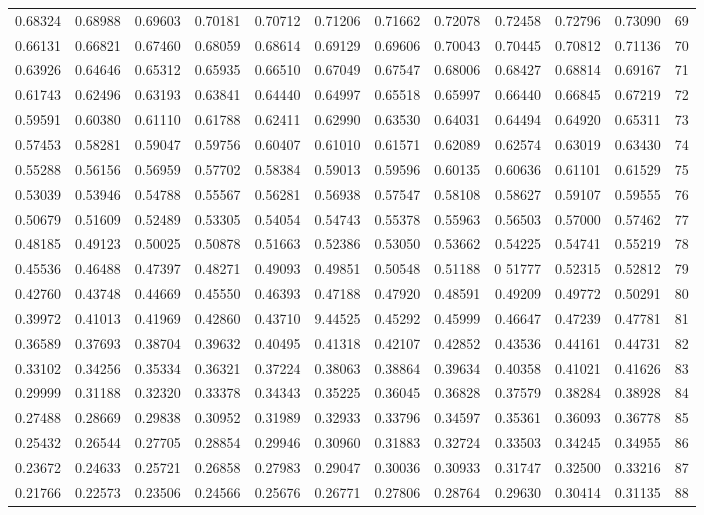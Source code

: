 \begin{center}
\begin{tabular}{|rrrrrrrrrrr|r|}
0.68324&0.68988&0.69603&0.70181&0.70712&0.71206&0.71662&0.72078&0.72458&0.72796&0.73090&69\\[5pt]
0.66131&0.66821&0.67460&0.68059&0.68614&0.69129&0.69606&0.70043&0.70445&0.70812&0.71136&70\\
0.63926&0.64646&0.65312&0.65935&0.66510&0.67049&0.67547&0.68006&0.68427&0.68814&0.69167&71\\
0.61743&0.62496&0.63193&0.63841&0.64440&0.64997&0.65518&0.65997&0.66440&0.66845&0.67219&72\\
0.59591&0.60380&0.61110&0.61788&0.62411&0.62990&0.63530&0.64031&0.64494&0.64920&0.65311&73\\
0.57453&0.58281&0.59047&0.59756&0.60407&0.61010&0.61571&0.62089&0.62574&0.63019&0.63430&74\\[5pt]
0.55288&0.56156&0.56959&0.57702&0.58384&0.59013&0.59596&0.60135&0.60636&0.61101&0.61529&75\\
0.53039&0.53946&0.54788&0.55567&0.56281&0.56938&0.57547&0.58108&0.58627&0.59107&0.59555&76\\
0.50679&0.51609&0.52489&0.53305&0.54054&0.54743&0.55378&0.55963&0.56503&0.57000&0.57462&77\\
0.48185&0.49123&0.50025&0.50878&0.51663&0.52386&0.53050&0.53662&0.54225&0.54741&0.55219&78\\
0.45536&0.46488&0.47397&0.48271&0.49093&0.49851&0.50548&0.51188&0 51777&0.52315&0.52812&79\\[5pt]
0.42760&0.43748&0.44669&0.45550&0.46393&0.47188&0.47920&0.48591&0.49209&0.49772&0.50291&80\\
0.39972&0.41013&0.41969&0.42860&0.43710&9.44525&0.45292&0.45999&0.46647&0.47239&0.47781&81\\
0.36589&0.37693&0.38704&0.39632&0.40495&0.41318&0.42107&0.42852&0.43536&0.44161&0.44731&82\\
0.33102&0.34256&0.35334&0.36321&0.37224&0.38063&0.38864&0.39634&0.40358&0.41021&0.41626&83\\
0.29999&0.31188&0.32320&0.33378&0.34343&0.35225&0.36045&0.36828&0.37579&0.38284&0.38928&84\\[5pt]
0.27488&0.28669&0.29838&0.30952&0.31989&0.32933&0.33796&0.34597&0.35361&0.36093&0.36778&85\\
0.25432&0.26544&0.27705&0.28854&0.29946&0.30960&0.31883&0.32724&0.33503&0.34245&0.34955&86\\
0.23672&0.24633&0.25721&0.26858&0.27983&0.29047&0.30036&0.30933&0.31747&0.32500&0.33216&87\\
0.21766&0.22573&0.23506&0.24566&0.25676&0.26771&0.27806&0.28764&0.29630&0.30414&0.31135&88\\

\end{tabular}
\end{center}

